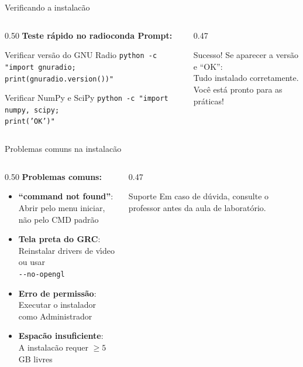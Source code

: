 \documentclass[aspectratio=169]{beamer}
\begin{document}
\begin{frame}{Verificando a instalac\~{a}o}
\begin{columns}
\begin{column}{0.50\textwidth}
  \textbf{Teste r\'{a}pido no radioconda Prompt:}
  \vspace{0.1cm}
  \begin{block}{Verificar vers\~{a}o do GNU Radio}
  {\small\texttt{python -c "import gnuradio;}\\\texttt{print(gnuradio.version())"}}
  \end{block}
  \vspace{0.1cm}
  \begin{block}{Verificar NumPy e SciPy}
  {\small\texttt{python -c "import numpy, scipy;}\\\texttt{print('OK')"}}
  \end{block}
\end{column}
\begin{column}{0.47\textwidth}
  \begin{exampleblock}{Sucesso!}
  Se aparecer a vers\~{a}o e ``OK'':\\
  Tudo instalado corretamente.\\
  Voc\^{e} est\'{a} pronto para as pr\'{a}ticas!
  \end{exampleblock}
\end{column}
\end{columns}
\end{frame}

\begin{frame}{Problemas comuns na instalac\~{a}o}
\begin{columns}
\begin{column}{0.50\textwidth}
  \textbf{Problemas comuns:}
  \begin{itemize}
    \item \textbf{``command not found''}:\\
      Abrir pelo menu iniciar, n\~{a}o pelo CMD padr\~{a}o
    \item \textbf{Tela preta do GRC}:\\
      Reinstalar drivers de v\'{\i}deo ou usar\\
      \texttt{-{}-no-opengl}
    \item \textbf{Erro de permiss\~{a}o}:\\
      Executar o instalador como Administrador
    \item \textbf{Espac\~{a}o insuficiente}:\\
      A instalac\~{a}o requer $\geq 5$ GB livres
  \end{itemize}
\end{column}
\begin{column}{0.47\textwidth}
  \begin{alertblock}{Suporte}
  Em caso de d\'{u}vida, consulte o professor
  antes da aula de laborat\'{o}rio.
  \end{alertblock}
\end{column}
\end{columns}
\end{frame}
\end{document}
